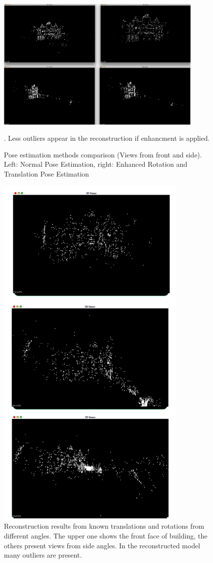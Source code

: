 \begin{figure}[p]
    \centering
    \includegraphics[width=0.9\textwidth]{PoseEstimationMethodComparison}
    \caption{Pose estimation methods comparison (Views from front and side). Left: Normal Pose Estimation, right: Enhanced Rotation and Translation Pose Estimation}. Less outliers appear in the reconstruction if enhancment is applied.
    \label{fig:PoseEstimationMethodComparison}
\end{figure}
\begin{figure}[p]
    \centering
    \includegraphics[height=18cm]{uniNone4000}
    \caption{Reconstruction results from known translations and rotations from different angles. The upper one shows the front face of building, the others present views from side angles. In the reconstructed model many outliers are present.}
    \label{fig:UniNone4000}
\end{figure}


